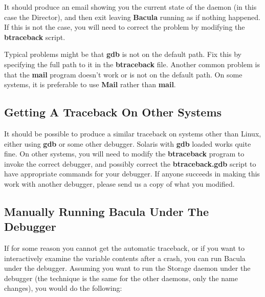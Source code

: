 It should produce an email showing you the current state of the daemon (in
this case the Director), and then exit leaving {\bf Bacula} running as if
nothing happened. If this is not the case, you will need to correct the
problem by modifying the {\bf btraceback} script. 

Typical problems might be that {\bf gdb} is not on the default path. Fix this
by specifying the full path to it in the {\bf btraceback} file. Another common
problem is that the {\bf mail} program doesn't work or is not on the default
path. On some systems, it is preferable to use {\bf Mail} rather than {\bf
mail}. 

\subsection*{Getting A Traceback On Other Systems}

It should be possible to produce a similar traceback on systems other than
Linux, either using {\bf gdb} or some other debugger. Solaris with {\bf gdb}
loaded works quite fine. On other systems, you will need to modify the {\bf
btraceback} program to invoke the correct debugger, and possibly correct the
{\bf btraceback.gdb} script to have appropriate commands for your debugger. If
anyone succeeds in making this work with another debugger, please send us a
copy of what you modified. 
\label{ManuallyDebugging}

\subsection*{Manually Running Bacula Under The Debugger}

If for some reason you cannot get the automatic traceback, or if you want to
interactively examine the variable contents after a crash, you can run Bacula
under the debugger. Assuming you want to run the Storage daemon under the
debugger (the technique is the same for the other daemons, only the name
changes), you would do the following: 

